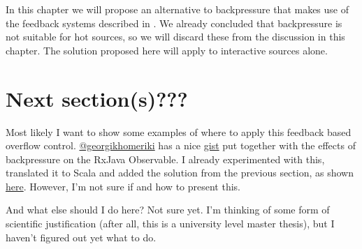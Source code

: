 In this chapter we will propose an alternative to backpressure that makes use of the feedback systems described in . We already concluded that backpressure is not suitable for hot sources, so we will discard these from the discussion in this chapter. The solution proposed here will apply to interactive sources alone.



\section*{Next section(s)???}
Most likely I want to show some examples of where to apply this feedback based overflow control. \href{https://github.com/GeorgiKhomeriki}{@georgikhomeriki} has a nice \href{https://gist.github.com/GeorgiKhomeriki/97cc281a086f5a12c96ad36fe95d0393}{gist} put together with the effects of backpressure on the RxJava Observable. I already experimented with this, translated it to Scala and added the solution from the previous section, as shown \href{https://github.com/Applied-Duality/Feedback-Control/blob/master/BackpressureControl/RxScala/src/main/scala/fbc/backpressure/BackpressureDemo.scala}{here}. However, I'm not sure if and how to present this.

And what else should I do here? Not sure yet. I'm thinking of some form of scientific justification (after all, this is a university level master thesis), but I haven't figured out yet what to do.
